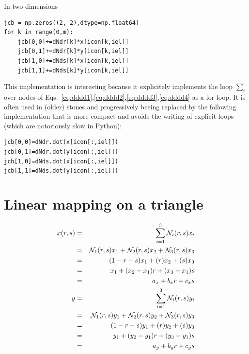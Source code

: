 In two dimensions 
\begin{lstlisting}
jcb = np.zeros((2, 2),dtype=np.float64)
for k in range(0,m):
    jcb[0,0]+=dNdr[k]*x[icon[k,iel]]
    jcb[0,1]+=dNdr[k]*y[icon[k,iel]]
    jcb[1,0]+=dNds[k]*x[icon[k,iel]]
    jcb[1,1]+=dNds[k]*y[icon[k,iel]]
\end{lstlisting}
This implementation is interesting because it explicitely 
implements the loop $\sum_i$ over nodes of 
Eqs.~\eqref{eq:dddd1},\eqref{eq:dddd2},\eqref{eq:dddd3},\eqref{eq:dddd4}
as a for loop.
It is often used in (older) stones and progressively beeing replaced by 
the following implementation that is more compact and avoids the writing of 
explicit loops (which are notoriously slow in Python):
\begin{lstlisting}
jcb[0,0]=dNdr.dot(x[icon[:,iel]])
jcb[0,1]=dNdr.dot(y[icon[:,iel]])
jcb[1,0]=dNds.dot(x[icon[:,iel]])
jcb[1,1]=dNds.dot(y[icon[:,iel]])
\end{lstlisting}



\section{Linear mapping on a triangle}

\begin{eqnarray}
x(r,s) 
&=& \sum_{i=1}^3 {\mathcal{N}}_i(r,s) x_i \nonumber\\
&=& {\mathcal{N}}_1(r,s) x_1 +{\mathcal{N}}_2(r,s) x_2 +{\mathcal{N}}_3(r,s) x_3   \nonumber\\
&=&  (1-r-s) x_1 +(r) x_2  +(s) x_3   \nonumber\\
&=& x_1 + (x_2-x_1) r + (x_3-x_1)s \nonumber\\
&=& a_x + b_x r + c_x s \nonumber\\
y 
&=& \sum_{i=1}^3 {\mathcal{N}}_i(r,s) y_i \nonumber\\
&=& {\mathcal{N}}_1(r,s) y_1 +{\mathcal{N}}_2(r,s) y_2 +{\mathcal{N}}_3(r,s) y_3   \nonumber\\
&=&  (1-r-s) y_1 +(r) y_2  +(s) y_3   \nonumber\\
&=& y_1 + (y_2-y_1) r + (y_3-y_1)s \nonumber\\
&=& a_y+ b_y r + c_y s \nonumber 
\end{eqnarray}

